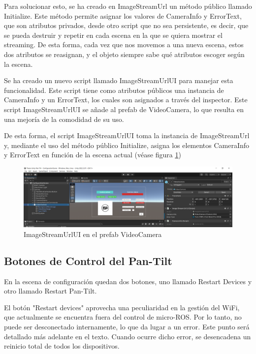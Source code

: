 Para solucionar esto, se ha creado en ImageStreamUrl un método público llamado Initialize. Este método permite asignar los valores de CameraInfo y ErrorText, que son atributos privados, desde otro script que no sea persistente, es decir, que se pueda destruir y repetir en cada escena en la que se quiera mostrar el streaming. De esta forma, cada vez que nos movemos a una nueva escena, estos dos atributos se reasignan, y el objeto siempre sabe qué atributos escoger según la escena.



Se ha creado un nuevo script llamado ImageStreamUrlUI para manejar esta funcionalidad. Este script tiene como atributos públicos una instancia de CameraInfo y un ErrorText, los cuales son asignados a través del inspector. Este script ImageStreamUrlUI se añade al prefab de VideoCamera, lo que resulta en una mejoría de la comodidad de su uso.



De esta forma, el script ImageStreamUrlUI toma la instancia de ImageStreamUrl y, mediante el uso del método público Initialize, asigna los elementos CameraInfo y ErrorText en función de la escena actual (véase figura \ref{figure:imagestreamurlui-videocameraprefab})

\begin{figure}[!htb]
   \centering
    \includegraphics[width=1\linewidth]{figures/imagestreamurlui-videocameraprefab.png}
   \caption{ImageStreamUrlUI en el prefab VideoCamera}
   \label{figure:imagestreamurlui-videocameraprefab}
\end{figure}


\subsection{Botones de Control del Pan-Tilt}
En la escena de configuración quedan dos botones, uno llamado Restart Devices y otro llamado Restart Pan-Tilt.


El botón "Restart devices" aprovecha una peculiaridad en la gestión del WiFi, que actualmente se encuentra fuera del control de micro-ROS. Por lo tanto, no puede ser desconectado internamente, lo que da lugar a un error. Este punto será detallado más adelante en el texto. Cuando ocurre dicho error, se desencadena un reinicio total de todos los dispositivos.

